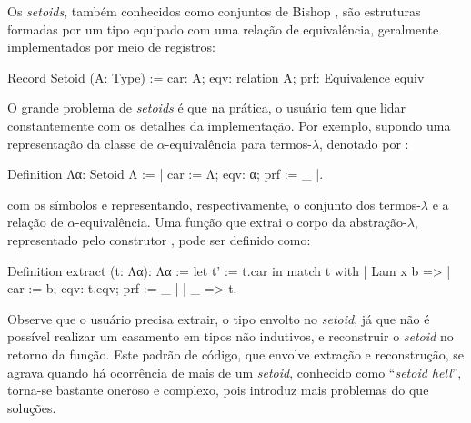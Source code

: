 Os \textit{setoids}, também conhecidos como conjuntos de Bishop \cite{Barthe2003,Bishop2012}, são estruturas formadas por um tipo equipado com uma relação de equivalência, geralmente implementados por meio de registros:
\begin{coqcode}
Record Setoid (A: Type) := {
   car: A; 
   eqv: relation A; 
   prf: Equivalence equiv
}
\end{coqcode}
O grande problema de \textit{setoids} é que na prática, o usuário tem que lidar constantemente com os detalhes da implementação. Por exemplo, supondo uma representação da classe de $\alpha$-equivalência para termos-$\lambda$, denotado por :
\begin{coqcode}
Definition Λα: Setoid Λ := {| car := Λ; eqv: α; prf := _ |}.
\end{coqcode}
com os símbolos  e  representando, respectivamente, o conjunto dos termos-$\lambda$ e a relação de $\alpha$-equivalência. 
Uma função que extrai o corpo da abstração-$\lambda$, representado pelo construtor , pode ser definido como:
\begin{coqcode}
Definition extract (t: Λα): Λα :=
   let t' := t.car in
   match t with
   | Lam x b => {| car := b; eqv: t.eqv; prf := _ |}
   | _ => t.
\end{coqcode}
Observe que o usuário precisa extrair, o tipo envolto no \textit{setoid}, já que não é possível realizar um casamento em tipos não indutivos, e reconstruir o \textit{setoid} no retorno da função. Este padrão de código, que envolve extração e reconstrução, se agrava quando há ocorrência de mais de um \textit{setoid}, conhecido como ``\textit{setoid hell}'', torna-se bastante oneroso e complexo, pois introduz mais problemas do que soluções.


